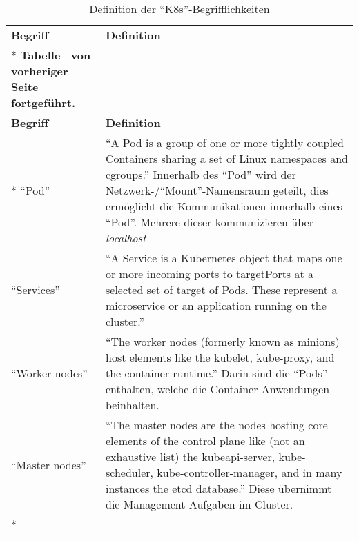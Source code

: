 \begin{longtable}{@{}lp{12.0cm}@{}}
	\toprule[1.5pt]
	\textbf{Begriff} & \textbf{Definition} \\* \midrule
	\endfirsthead
	\multicolumn{2}{c}%
	{{\bfseries Tabelle \thetable\ von vorheriger Seite fortgeführt.}} \\
	\toprule
	\textbf{Begriff} & \textbf{Definition} \\* \midrule
	\endhead
	\bottomrule
	\endfoot
	\endlastfoot
	\enquote{Pod}              & \enquote{A Pod is a group of one or more tightly coupled Containers sharing a set of Linux namespaces and cgroups.} Innerhalb des \enquote{Pod} wird der Netzwerk-/\enquote{Mount}-Namensraum geteilt, dies ermöglicht die Kommunikationen innerhalb eines \enquote{Pod}. Mehrere dieser kommunizieren über \textit{localhost} \\
	\enquote{Services}         & \enquote{A Service is a Kubernetes object that maps one or more incoming ports to targetPorts at a selected set of target of Pods. These represent a microservice or an application running on the cluster.} \\
	\enquote{Worker nodes}     & \enquote{The worker nodes (formerly known as minions) host elements like the kubelet, kube-proxy, and the container runtime.} Darin sind die \enquote{Pods} enthalten, welche die Container-Anwendungen beinhalten. \\
	\enquote{Master nodes}     & \enquote{The master nodes are the nodes hosting core elements of the control plane like (not an exhaustive list) the kubeapi-server, kube-scheduler, kube-controller-manager, and in many	instances the etcd database.} Diese übernimmt die Management-Aufgaben im Cluster. \\* \bottomrule
	
	\caption{Definition der \enquote{\ac{K8s}}-Begrifflichkeiten}\label{tab:definitionenK8s}\\
\end{longtable}




